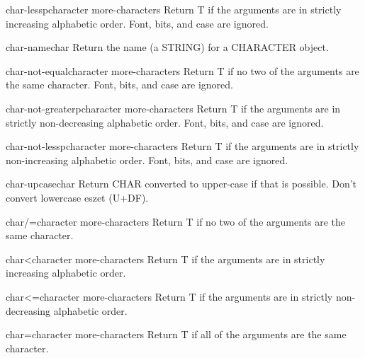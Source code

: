 \begin{function}{char-lessp}{character \rest more-characters}{}{}
  Return T if the arguments are in strictly increasing alphabetic order.
   Font, bits, and case are ignored.
\end{function}

\begin{function}{char-name}{char}{}{}
  Return the name (a STRING) for a CHARACTER object.
\end{function}

\begin{function}{char-not-equal}{character \rest more-characters}{}{}
  Return T if no two of the arguments are the same character.
   Font, bits, and case are ignored.
\end{function}

\begin{function}{char-not-greaterp}{character \rest more-characters}{}{}
  Return T if the arguments are in strictly non-decreasing alphabetic order.
   Font, bits, and case are ignored.
\end{function}

\begin{function}{char-not-lessp}{character \rest more-characters}{}{}
  Return T if the arguments are in strictly non-increasing alphabetic order.
   Font, bits, and case are ignored.
\end{function}

\begin{function}{char-upcase}{char}{}{}
  Return CHAR converted to upper-case if that is possible.  Don't convert
   lowercase eszet (U+DF).
\end{function}

\begin{function}{char/=}{character \rest more-characters}{}{}
  Return T if no two of the arguments are the same character.
\end{function}

\begin{function}{char<}{character \rest more-characters}{}{}
  Return T if the arguments are in strictly increasing alphabetic order.
\end{function}

\begin{function}{char<=}{character \rest more-characters}{}{}
  Return T if the arguments are in strictly non-decreasing alphabetic order.
\end{function}

\begin{function}{char=}{character \rest more-characters}{}{}
  Return T if all of the arguments are the same character.
\end{function}

